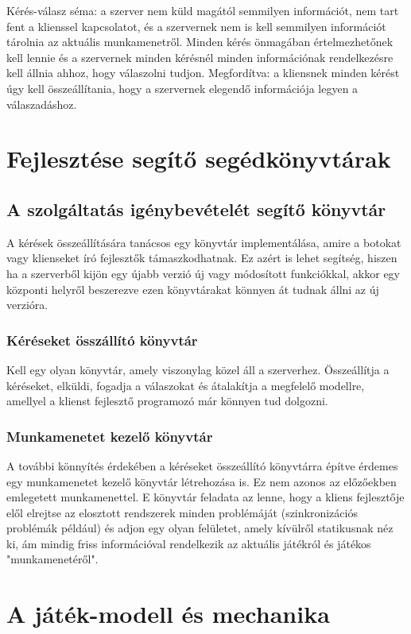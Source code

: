 \documentclass[twoside, a4paper, 12pt]{book}
\begin{document}
Kérés-válasz séma: a szerver nem küld magától semmilyen információt, nem tart fent a klienssel kapcsolatot, és a szervernek nem is kell semmilyen információt tárolnia az aktuális munkamenetről. Minden kérés önmagában értelmezhetőnek kell lennie és a szervernek minden kérésnél minden információnak rendelkezésre kell állnia ahhoz, hogy válaszolni tudjon. Megfordítva: a kliensnek minden kérést úgy kell összeállítania, hogy a szervernek elegendő információja legyen a válaszadáshoz.

\section{Fejlesztése segítő segédkönyvtárak}
\subsection{A szolgáltatás igénybevételét segítő könyvtár}
A kérések összeállítására tanácsos egy könyvtár implementálása, amire a botokat vagy klienseket író fejlesztők támaszkodhatnak. Ez azért is lehet segítség, hiszen ha a szerverből kijön egy újabb verzió új vagy módosított funkciókkal, akkor egy központi helyről beszerezve ezen könyvtárakat könnyen át tudnak állni az új verzióra.

\subsubsection{Kéréseket összállító könyvtár}
Kell egy olyan könyvtár, amely viszonylag közel áll a szerverhez. Összeállítja a kéréseket, elküldi, fogadja a válaszokat és átalakítja a megfelelő modellre, amellyel a klienst fejlesztő programozó már könnyen tud dolgozni.

\subsubsection{Munkamenetet kezelő könyvtár}
A további könnyítés érdekében a kéréseket összeállító könyvtárra építve érdemes egy munkamenetet kezelő könyvtár létrehozása is. Ez nem azonos az előzőekben emlegetett munkamenettel. E könyvtár feladata az lenne, hogy a kliens fejlesztője elől elrejtse az elosztott rendszerek minden problémáját (szinkronizációs problémák például) és adjon egy olyan felületet, amely kívülről statikusnak néz ki, ám mindig friss információval rendelkezik az aktuális játékról és játékos "munkamenetéről".

\section{A játék-modell és mechanika}
\end{document}
